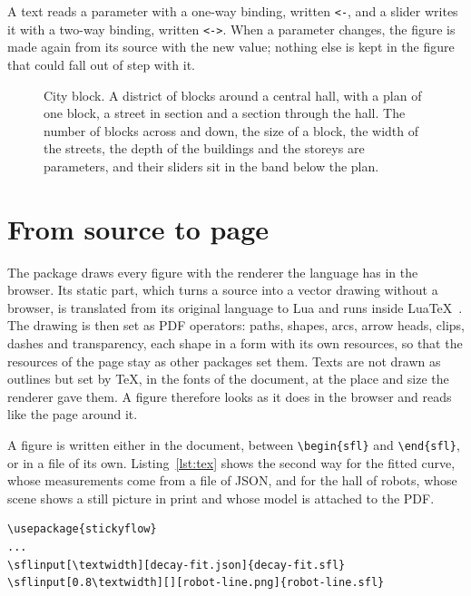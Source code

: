 \documentclass[10pt,twocolumn]{article}
\newcommand\figurehint{%
  \par\vspace{4pt}\hfill\sflhint[\textcolor{hint}{\itshape\footnotesize Interactive figure: open this PDF with the stickyflow
  extension}]\par\smallskip}
\begin{document}
A text reads a parameter with a one-way binding, written \texttt{<-}, and a slider writes it with a two-way binding, written
\texttt{<->}. When a parameter changes, the figure is made again from its source with the new value; nothing else is kept in the figure
that could fall out of step with it.

\begin{figure}[t]
\figurehint
\centering
{}
\caption{City block. A district of blocks around a central hall, with a plan of one block, a street in section and a section through
the hall. The number of blocks across and down, the size of a block, the width of the streets, the depth of the buildings and the
storeys are parameters, and their sliders sit in the band below the plan.}
\label{fig:city}
\end{figure}

\section{From source to page}

The package draws every figure with the renderer the language has in the browser. Its static part, which turns a source into a vector
drawing without a browser, is translated from its original language to Lua and runs inside LuaTeX~\cite{luatex}. The drawing is then
set as PDF operators: paths, shapes, arcs, arrow heads, clips, dashes and transparency, each shape in a form with its own resources, so
that the resources of the page stay as other packages set them. Texts are not drawn as outlines but set by TeX, in the fonts of the
document, at the place and size the renderer gave them. A figure therefore looks as it does in the browser and reads like the page
around it.

A figure is written either in the document, between \texttt{\textbackslash{}begin\{sfl\}} and \texttt{\textbackslash{}end\{sfl\}}, or
in a file of its own. Listing~\ref{lst:tex} shows the second way for the fitted curve, whose measurements come from a file of JSON, and
for the hall of robots, whose scene shows a still picture in print and whose model is attached to the PDF.

\begin{lstlisting}[float=t,caption={Two figures of this paper in the document: the fitted curve with its table, and the hall of robots with the still picture of its scene.},label={lst:tex}]
\usepackage{stickyflow}
...
\sflinput[\textwidth][decay-fit.json]{decay-fit.sfl}
\sflinput[0.8\textwidth][][robot-line.png]{robot-line.sfl}
\end{lstlisting}
\end{document}
